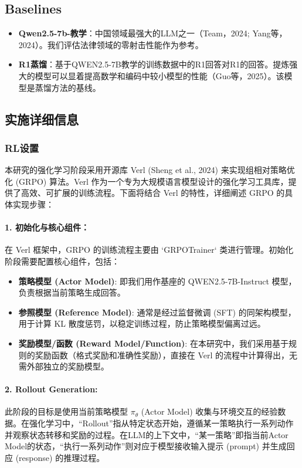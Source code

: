 \documentclass{pkuthesis}
\begin{document}
\subsection{Baselines}
\begin{itemize}
    \item \textbf{Qwen2.5-7b-教学}：中国领域最强大的LLM之一（Team，2024; Yang等，2024）。我们评估法律领域的零射击性能作为参考。
    \item \textbf{R1蒸馏}：基于QWEN2.5-7B教学的训练数据中的R1回答对R1的回答。提炼强大的模型可以显着提高数学和编码中较小模型的性能（Guo等，2025）。该模型是蒸馏方法的基线。
\end{itemize}

\subsection{实施详细信息}
\subsubsection{RL设置}
本研究的强化学习阶段采用开源库 Verl (Sheng et al., 2024) 来实现组相对策略优化 (GRPO) 算法。Verl 作为一个专为大规模语言模型设计的强化学习工具库，提供了高效、可扩展的训练流程。下面将结合 Verl 的特性，详细阐述 GRPO 的具体实现步骤：

\paragraph{1. 初始化与核心组件：}
在 Verl 框架中，GRPO 的训练流程主要由 `GRPOTrainer` 类进行管理。初始化阶段需要配置核心组件，包括：
\begin{itemize}
    \item \textbf{策略模型 (Actor Model)}: 即我们用作基座的 QWEN2.5-7B-Instruct 模型，负责根据当前策略生成回答。
    \item \textbf{参照模型 (Reference Model)}: 通常是经过监督微调 (SFT) 的同架构模型，用于计算 KL 散度惩罚，以稳定训练过程，防止策略模型偏离过远。
    \item \textbf{奖励模型/函数 (Reward Model/Function)}: 在本研究中，我们采用基于规则的奖励函数（格式奖励和准确性奖励），直接在 Verl 的流程中计算得出，无需外部独立的奖励模型。
\end{itemize}

\paragraph{2. Rollout Generation:}
此阶段的目标是使用当前策略模型 $\pi_{\theta}$ (Actor Model) 收集与环境交互的经验数据。在强化学习中，“Rollout”指从特定状态开始，遵循某一策略执行一系列动作并观察状态转移和奖励的过程。在LLM的上下文中，“某一策略”即指当前Actor Model的状态，“执行一系列动作”则对应于模型接收输入提示 (prompt) 并生成回应 (response) 的推理过程。
\end{document}
